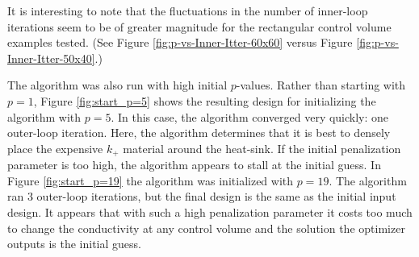 It is interesting to note that the fluctuations in the number of inner-loop iterations seem to be of greater magnitude for the rectangular control volume examples tested. (See Figure \ref{fig:p-vs-Inner-Itter-60x60} versus Figure \ref{fig:p-vs-Inner-Itter-50x40}.)

The algorithm was also run with high initial $p$-values. Rather than starting with $p=1$, Figure \ref{fig:start_p=5} shows the resulting design for initializing the algorithm with $p=5$. In this case, the algorithm converged very quickly: one outer-loop iteration. Here, the algorithm determines that it is best to densely place the expensive $k_+$ material around the heat-sink. If the initial penalization parameter is too high, the algorithm appears to stall at the initial guess. In Figure \ref{fig:start_p=19} the algorithm was initialized with $p=19$. The algorithm ran 3 outer-loop iterations, but the final design is the same as the initial input design. It appears that with such a high penalization parameter it costs too much to change the conductivity at any control volume and the solution the optimizer outputs is the initial guess.

